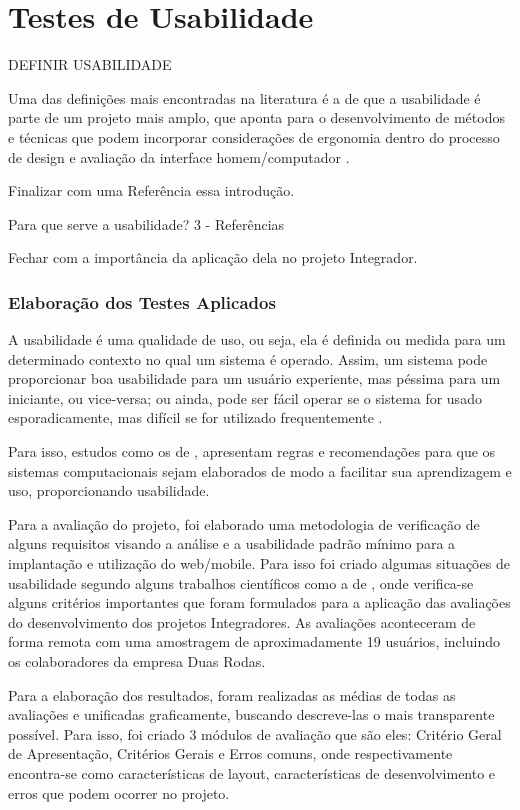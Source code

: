 \chapter{ Testes de Usabilidade}

DEFINIR USABILIDADE

Uma das definições mais encontradas na literatura é a de que a usabilidade é parte de um projeto mais amplo, que aponta para o desenvolvimento de métodos e técnicas que podem incorporar considerações de ergonomia dentro do processo de design e avaliação da interface homem/computador \cite{bastien1993ergonomic}.

Finalizar com uma Referência essa introdução. 

Para que serve a usabilidade?  3 -  Referências

Fechar com a  importância da aplicação dela no projeto Integrador.


\subsection{Elaboração dos Testes Aplicados}

A usabilidade é uma qualidade de uso, ou seja, ela é definida ou medida para um determinado contexto no qual um sistema é operado. Assim, um sistema pode proporcionar boa usabilidade para um usuário experiente, mas péssima para um iniciante, ou vice-versa; ou ainda, pode ser fácil operar se o sistema for usado esporadicamente, mas difícil se for utilizado frequentemente \cite{cybis2003engenharia}.

Para isso, estudos como os de \cite{bastien1993ergonomic}, apresentam regras e recomendações para que os sistemas computacionais sejam elaborados de modo a facilitar sua aprendizagem e uso, proporcionando usabilidade.

Para a avaliação do projeto, foi elaborado uma metodologia de verificação de alguns requisitos visando a análise e a usabilidade padrão mínimo para a implantação e utilização do web/mobile. Para isso foi criado algumas situações de usabilidade segundo alguns trabalhos científicos como a de \cite{silva2016principios}, onde verifica-se alguns critérios importantes que foram formulados para a aplicação das avaliações do desenvolvimento dos projetos Integradores. As avaliações aconteceram de forma remota com uma amostragem de aproximadamente 19 usuários, incluindo os colaboradores da empresa Duas Rodas.

Para a elaboração dos resultados, foram realizadas as médias de todas as avaliações e unificadas graficamente, buscando descreve-las o mais transparente possível. Para isso, foi criado 3 módulos de avaliação que são eles: Critério Geral de Apresentação, Critérios Gerais e Erros comuns, onde respectivamente encontra-se como características de layout, características de desenvolvimento e erros que podem ocorrer no projeto.

